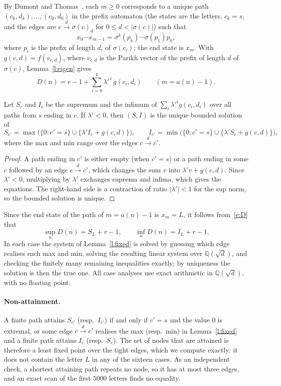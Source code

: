 By Dumont and Thomas~\cite{DT}, each $m\ge 0$ corresponds to a unique path
$(c_k,d_k),\dots,(c_0,d_0)$ in the prefix automaton (the states are the letters, $c_k=s$, and the edges
are $c\xrightarrow{d}\sigma(c)_d$ for $0\le d<|\sigma(c)|$) such that
\[ x_0\cdots x_{m-1}=\sigma^k(p_k)\cdots\sigma(p_1)p_0, \]
where $p_i$ is the prefix of length $d_i$ of $\sigma(c_i)$; the end state is $x_m$. With
$g(c,d)=f(v_{c,d})$, where $v_{c,d}$ is the Parikh vector of the prefix of length $d$ of $\sigma(c)$,
Lemma~\ref{l:eigen} gives
\begin{equation}\label{e:D}
D(n)= r-1+\sum_{i=0}^{k}\lambda'^{\,i}\,g(c_i,d_i)\qquad (m=a(n)-1).
\end{equation}

\begin{lemma}\label{l:fixed} Let $S_c$ and $I_c$ be the supremum and the infimum of
$\sum_i\lambda'^i g(c_i,d_i)$ over all paths from $s$ ending in $c$. If $\lambda'<0$, then $(S,I)$ is the
unique bounded solution of
\[ S_{c'}=\max\bigl(\{0 : c'=s\}\cup\{\lambda' I_c+g(c,d)\}\bigr),\qquad
   I_{c'}=\min\bigl(\{0 : c'=s\}\cup\{\lambda' S_c+g(c,d)\}\bigr), \]
where the max and min range over the edges $c\xrightarrow{d}c'$. \end{lemma}
\begin{proof} A path ending in $c'$ is either empty (when $c'=s$) or a path ending in some $c$ followed by
an edge $c\xrightarrow{d}c'$, which changes the sum $v$ into $\lambda' v+g(c,d)$. Since $\lambda'<0$,
multiplying by $\lambda'$ exchanges suprema and infima, which gives the equations. The right-hand side is
a contraction of ratio $|\lambda'|<1$ for the sup norm, so the bounded solution is unique. \end{proof}

Since the end state of the path of $m=a(n)-1$ is $x_m=L$, it follows from~\eqref{e:D} that
\[ \sup_n D(n)=S_L+r-1,\qquad \inf_n D(n)=I_L+r-1. \]
In each case the system of Lemma~\ref{l:fixed} is solved by guessing which edge realises each max and min,
solving the resulting linear system over $\mathbb{Q}(\sqrt d)$, and checking the finitely many remaining
inequalities exactly; by uniqueness the solution is then the true one. All case analyses use exact
arithmetic in $\mathbb{Q}(\sqrt d)$, with no floating point.

\paragraph{Non-attainment.} A finite path attains $S_{c'}$ (resp.\ $I_{c'}$) if and only if $c'=s$ and
the value $0$ is extremal, or some edge $c\xrightarrow{d}c'$ realises the max (resp.\ min) in
Lemma~\ref{l:fixed} and a finite path attains $I_c$ (resp.\ $S_c$). The set of nodes that are attained is
therefore a least fixed point over the tight edges, which we compute exactly: it does not contain the
letter $L$ in any of the sixteen cases. As an independent check, a shortest attaining path repeats no node,
so it has at most three edges, and an exact scan of the first $5000$ letters finds no equality.

